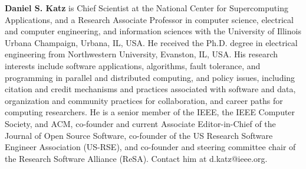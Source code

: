 \documentclass{IEEEcsmag}
\begin{document}
\textbf{Daniel S. Katz} is Chief Scientist at the National Center for Supercomputing Applications, and a Research Associate Professor in computer science, electrical and computer engineering, and information sciences with the University of Illinois Urbana Champaign, Urbana, IL, USA. He received the Ph.D. degree in electrical engineering from Northwestern University, Evanston, IL, USA. His research interests include software applications, algorithms, fault tolerance, and programming in parallel and distributed computing, and policy issues, including citation and credit mechanisms and practices associated with software and data, organization and community practices for collaboration, and career paths for computing researchers.
He is a senior member of the IEEE, the IEEE Computer Society, and ACM, co-founder and current Associate Editor-in-Chief of the Journal of Open Source Software, co-founder of the US Research Software Engineer Association (US-RSE), and co-founder and steering committee chair of the Research Software Alliance (ReSA).
Contact him at d.katz@ieee.org.
\end{document}
